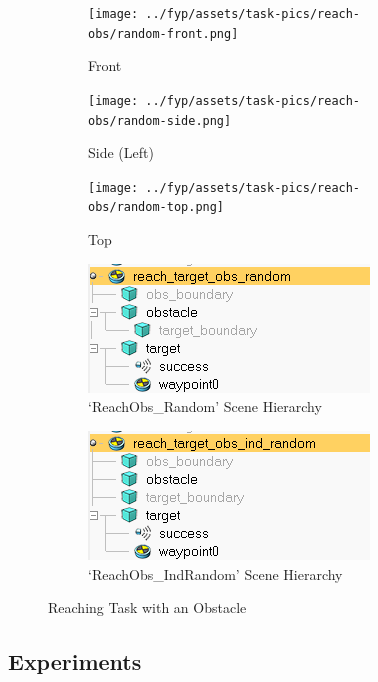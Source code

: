 \begin{figure}[htpb] %
  \centering
  \begin{subfigure}{0.3\linewidth}
    \centering
    \texttt{[image: ../fyp/assets/task-pics/reach-obs/random-front.png]}
    \caption{Front}
  \end{subfigure}
  \hfill
  \begin{subfigure}{0.3\linewidth}
    \centering
    \texttt{[image: ../fyp/assets/task-pics/reach-obs/random-side.png]}
    \caption{Side (Left)}
  \end{subfigure}
  \hfill
  \begin{subfigure}{0.3\linewidth}
    \centering
    \texttt{[image: ../fyp/assets/task-pics/reach-obs/random-top.png]}
    \caption{Top}
  \end{subfigure}
  \vfill
  \begin{subfigure}{0.45\linewidth}
    \centering
    \includegraphics[scale=0.5]{assets/early-work/obs-random-scene-hierarchy.png}
    \caption{`ReachObs\_Random' Scene Hierarchy}
  \end{subfigure}
  \hfill
  \begin{subfigure}{0.45\linewidth}
    \centering
    \includegraphics[scale=0.5]{assets/early-work/obs-ind-random-scene-hierarchy.png}
    \caption{`ReachObs\_IndRandom' Scene Hierarchy}
  \end{subfigure}
  \caption{Reaching Task with an Obstacle}\label{fig:reach-obs-random}
\end{figure} 

\subsection{Experiments}

